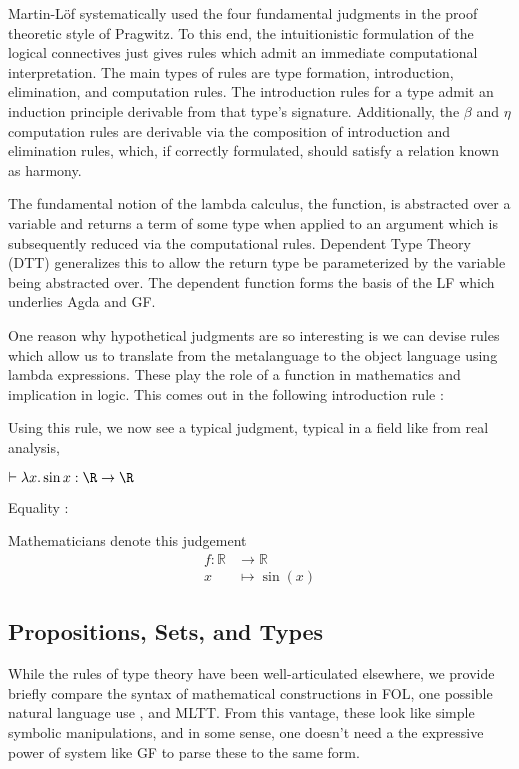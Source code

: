 Martin-Löf systematically used the four fundamental judgments in the proof
theoretic style of Pragwitz. To this end, the intuitionistic formulation of the
logical connectives just gives rules which admit an immediate computational
interpretation. The main types of rules are type formation, introduction,
elimination, and computation rules. The introduction rules for a type admit an
induction principle derivable from that type's signature. Additionally, the
$\beta$ and $\eta$ computation rules are derivable via the composition of
introduction and elimination rules, which, if correctly formulated, should
satisfy a relation known as harmony.

The fundamental notion of the lambda calculus, the function, is 
abstracted over a variable and returns a term of some type when applied to an
argument which is subsequently reduced via the computational rules.
Dependent Type Theory (DTT) generalizes this to allow the return type be
parameterized by the variable being abstracted over. The dependent function
forms the basis of the LF which underlies Agda and GF. 

One reason why hypothetical judgments are so interesting is we can devise rules
which allow us to translate from the metalanguage to the object language using
lambda expressions. These play the role of a function in mathematics and
implication in logic. This comes out in the following introduction rule :


Using this rule, we now see a typical judgment, typical in a field like from
real analysis,

$\vdash \lambda x. \sin x : \R \rightarrow \R$

Equality :

Mathematicians denote this judgement
\begin{align*} f {:} \mathbb{R} &\rightarrow \mathbb{R}\\ x &\mapsto \sin ( x )
\end{align*}

\subsection{Propositions, Sets, and Types}

While the rules of type theory have been well-articulated elsewhere, we provide
briefly compare the syntax of mathematical constructions in FOL, one possible
natural language use \cite{rantaLog}, and MLTT. From this vantage, these look
like simple symbolic manipulations, and in some sense, one doesn't need a the
expressive power of system like GF to parse these to the same form.

